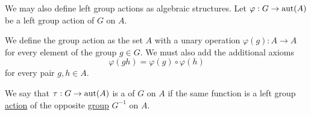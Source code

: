 \begin{remark}\label{remark:left_group_actions_as_algebraic_structures}
  We may also define left group actions as algebraic structures. Let \( \varphi: G \to \operatorname{aut}(A) \) be a left group action of \( G \) on \( A \).

  We define the group action as the set \( A \) with a unary operation \( \varphi(g): A \to A \) for every element of the group \( g \in G \). We must also add the additional axioms
  \begin{equation*}
    \varphi(gh) = \varphi(g) \circ \varphi(h)
  \end{equation*}
  for every pair \( g, h \in A \).
\end{remark}

\begin{definition}\label{def:right_group_action}
  We say that \( \tau: G \to \operatorname{aut}(A) \) is a  of \( G \) on \( A \) if the same function is a left group \hyperref[def:left_group_action]{action} of the opposite \hyperref[def:opposite_group]{group} \( G^{-1} \) on \( A \).
\end{definition}
